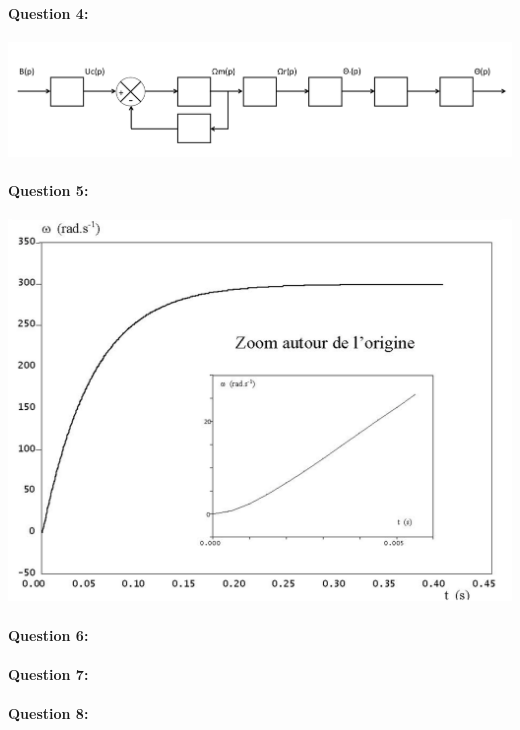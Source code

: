 \reponse[4]

\paragraph{Question 4:}

\begin{center}
  \includegraphics[width=0.9\linewidth]{img/rep2}
\end{center}

\paragraph{Question 5:}

\begin{center}
  \includegraphics[width=0.6\linewidth]{img/rep3}
\end{center}

\reponse[2]

\paragraph{Question 6:}

\reponse[2]

\paragraph{Question 7:}

\reponse[3]

\paragraph{Question 8:}


